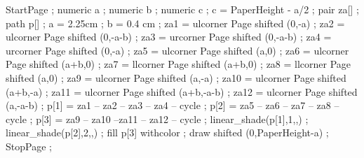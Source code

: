 

\Slidetitle{\page\setlayer[slidetitle]%
     {\framed[framecolor=red,frame=off,width=\textwidth,height=2.25cm,offset=0pt,align=middle,top=\vss,bottom=\vss]{\switchtobodyfont[\Titlesize]\color[d]{#1}}}}





\startmode[bluemode]
\definecolor [Item]            [b=.8]
\definecolor [a]               [s=.95]
\definecolor [b]               [r=0,g=0,b=1]
\definecolor [c]               [r=.69,g=.69,b=.97]
\definecolor [d]               [b=.8]
\stopmode

\startmode[redmode]
\definecolor [Item]            [r=.8]
\definecolor [a]               [s=.95]
\definecolor [b]               [r=1]
\definecolor [c]               [b=.69,g=.69,r=.97]
\definecolor [d]               [r=.8]
\stopmode

\startmode[greenmode]
\definecolor [Item]            [g=.4]
\definecolor [a]               [s=.95]
\definecolor [b]               [g=.4]
\definecolor [c]               [b=.68,r=.68,g=.79]
\definecolor [d]               [g=.4]
\stopmode


StartPage ;
numeric a ;
numeric b ;
numeric c ;
c = PaperHeight - a/2 ;
pair za[] ;
path p[] ;
a = 2.25cm ;
b = 0.4 cm ;
za1 = ulcorner Page shifted (0,-a) ;
za2 = ulcorner Page shifted (0,-a-b) ;
za3 = urcorner Page shifted (0,-a-b) ;
za4 = urcorner Page shifted (0,-a) ;
za5 = ulcorner Page shifted (a,0) ;
za6 = ulcorner Page shifted (a+b,0) ;
za7 = llcorner Page shifted (a+b,0) ;
za8 = llcorner Page shifted (a,0) ;
za9 = ulcorner Page shifted (a,-a) ;
za10 = ulcorner Page shifted (a+b,-a) ;
za11 = ulcorner Page shifted (a+b,-a-b) ;
za12 = ulcorner Page shifted (a,-a-b) ;
p[1] = za1 -- za2 -- za3 -- za4 -- cycle ;
p[2] = za5 -- za6 -- za7 -- za8 -- cycle ;
p[3] = za9 -- za10 --za11 -- za12 -- cycle ;
linear_shade(p[1],1,,) ;
linear_shade(p[2],2,,) ;
fill p[3] withcolor  ;
draw \sometxt{\framed[frame=off,width=2.25cm,height=2.25cm]{\color[d]{\tfx \folio}}} shifted (0,PaperHeight-a) ;
StopPage ;
\stopuseMPgraphic

